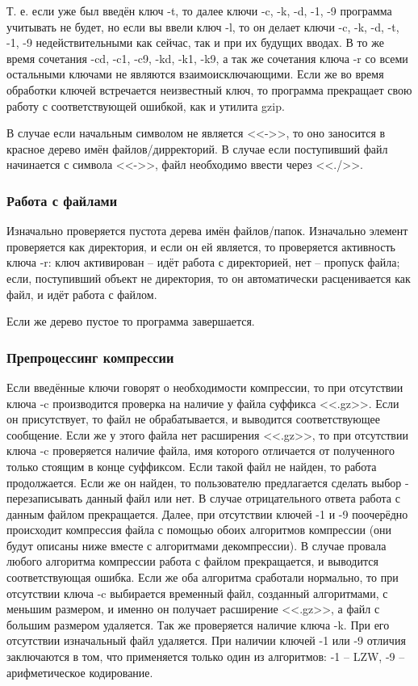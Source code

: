 \documentclass[12pt]{article}
\begin{document}
Т. е. если уже был введён ключ -t, то далее ключи -c, -k, -d, -1, -9 программа учитывать не будет, но если вы ввели ключ -l, то он делает ключи -c, -k, -d, -t, -1, -9 недействительными как сейчас, так и при их будущих вводах. В то же время сочетания -cd, -c1, -c9, -kd, -k1, -k9, а так же сочетания ключа -r со всеми остальными ключами не являются взаимоисключающими. Если же во время обработки ключей встречается неизвестный ключ, то программа прекращает свою работу с соответствующей ошибкой, как и утилита gzip.

В случае если начальным символом не является <<->>, то оно заносится в красное дерево имён файлов/дирректорий. В случае если поступивший файл начинается с символа <<->>, файл необходимо ввести через <<./>>.

\subsubsection*{Работа с файлами}

Изначально проверяется пустота дерева имён файлов/папок. Изначально элемент проверяется как директория, и если он ей является, то проверяется активность ключа -r: ключ активирован -- идёт работа с директорией, нет -- пропуск файла; если, поступивший объект не директория, то он автоматически расценивается как файл, и идёт работа с файлом.

Если же дерево пустое то программа завершается.

\subsubsection*{Препроцессинг компрессии}

Если введённые ключи говорят о необходимости компрессии, то при отсутствии ключа -c производится проверка на наличие у файла суффикса <<.gz>>. Если он присутствует, то файл не обрабатывается, и выводится соответствующее сообщение. Если же у этого файла нет расширения <<.gz>>, то при отсутствии ключа -c проверяется наличие файла, имя которого отличается от полученного только стоящим в конце суффиксом. Если такой файл не найден, то работа продолжается. Если же он найден, то пользователю предлагается сделать выбор - перезаписывать данный файл или нет. В случае отрицательного ответа работа с данным файлом прекращается. Далее, при отсутствии ключей -1 и -9 поочерёдно происходит компрессия файла с помощью обоих алгоритмов компрессии (они будут описаны ниже вместе с алгоритмами декомпрессии). В случае провала любого алгоритма компрессии работа с файлом прекращается, и выводится соответствующая ошибка. Если же оба алгоритма сработали нормально, то при отсутствии ключа -c выбирается временный файл, созданный алгоритмами, с меньшим размером, и именно он получает расширение <<.gz>>, а файл с большим размером удаляется. Так же проверяется наличие ключа -k. При его отсутствии изначальный файл удаляется. При наличии ключей -1 или -9 отличия заключаются в том, что применяется только один из алгоритмов: -1 -- LZW, -9 -- арифметическое кодирование.
\end{document}
